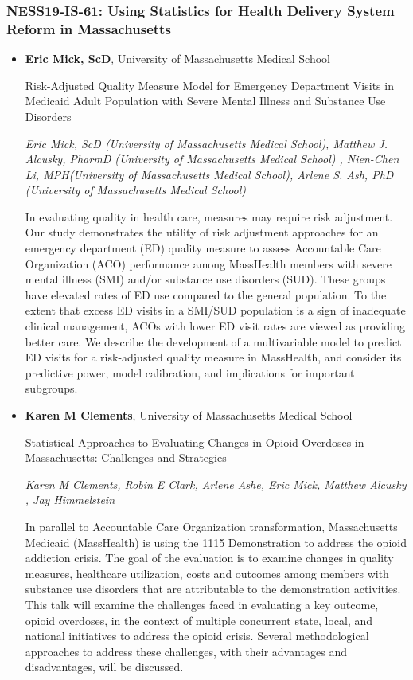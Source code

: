 \subsubsection*{NESS19-IS-61: Using Statistics for Health Delivery System Reform in Massachusetts}

\begin{itemize}
\item \textbf{Eric Mick, ScD}, University of Massachusetts Medical School

Risk-Adjusted Quality Measure Model for Emergency Department Visits in Medicaid Adult Population with Severe Mental Illness and Substance Use Disorders

\emph{\footnotesize Eric Mick, ScD (University of Massachusetts Medical School), Matthew J. Alcusky, PharmD (University of Massachusetts Medical School) , Nien-Chen Li, MPH(University of Massachusetts Medical School), Arlene S. Ash, PhD (University of Massachusetts Medical School)}

In evaluating quality in health care, measures may require risk adjustment. Our study demonstrates the utility of risk adjustment approaches for an emergency department (ED) quality measure to assess Accountable Care Organization (ACO) performance among MassHealth members with severe mental illness (SMI) and/or substance use disorders (SUD). These groups have elevated rates of ED use compared to the general population. To the extent that excess ED visits in a SMI/SUD population is a sign of inadequate clinical management, ACOs with lower ED visit rates are viewed as providing better care. We describe the development of a multivariable model to predict ED visits for a risk-adjusted quality measure in MassHealth, and consider its predictive power, model calibration, and implications for important subgroups.

\item \textbf{Karen M Clements}, University of Massachusetts Medical School

Statistical Approaches to Evaluating Changes in Opioid Overdoses in Massachusetts: Challenges and Strategies

\emph{\footnotesize Karen M Clements, Robin E Clark, Arlene Ashe, Eric Mick, Matthew Alcusky , Jay Himmelstein}

In parallel to Accountable Care Organization transformation, Massachusetts Medicaid (MassHealth)  is using the 1115 Demonstration to address the opioid addiction crisis.  The goal of the evaluation is to examine changes in quality measures, healthcare utilization, costs and outcomes among members with substance use disorders that are attributable to the demonstration activities.  This talk will  examine the challenges faced in  evaluating a  key outcome, opioid overdoses, in the context of multiple concurrent state, local, and national initiatives to address the opioid crisis.   Several  methodological approaches to  address these challenges, with their advantages and disadvantages, will be discussed.


\end{itemize}
